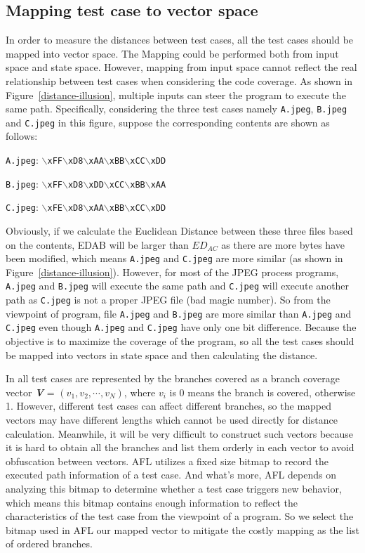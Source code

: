 \subsection{Mapping test case to vector space}
In order to measure the distances between test cases, all the test cases should be mapped into vector space. The Mapping could be performed both from input space and state space. However, mapping from input space cannot reflect the real relationship between test cases when considering the code coverage. As shown in Figure~\ref{distance-illusion}, multiple inputs can steer the program to execute the same path. Specifically, considering the three test cases namely \texttt{A.jpeg}, \texttt{B.jpeg} and \texttt{C.jpeg} in this figure, suppose the corresponding contents are shown as follows:

\texttt{A.jpeg}: \texttt{$\backslash$xFF$\backslash$xD8$\backslash$xAA$\backslash$xBB$\backslash$xCC$\backslash$xDD}

\texttt{B.jpeg}: \texttt{$\backslash$xFF$\backslash$xD8$\backslash$xDD$\backslash$xCC$\backslash$xBB$\backslash$xAA}

\texttt{C.jpeg}: \texttt{$\backslash$xFE$\backslash$xD8$\backslash$xAA$\backslash$xBB$\backslash$xCC$\backslash$xDD}

Obviously, if we calculate the Euclidean Distance between these three files based on the contents, EDAB will be larger than $ED_{AC}$ as there are more bytes have been modified, which means \texttt{A.jpeg} and \texttt{C.jpeg} are more similar (as shown in Figure~\ref{distance-illusion}). However, for most of the JPEG process programs, \texttt{A.jpeg} and \texttt{B.jpeg} will execute the same path and \texttt{C.jpeg} will execute another path as \texttt{C.jpeg} is not a proper JPEG file (bad magic number). So from the viewpoint of program, file \texttt{A.jpeg} and \texttt{B.jpeg} are more similar than \texttt{A.jpeg} and \texttt{C.jpeg} even though \texttt{A.jpeg} and \texttt{C.jpeg} have only one bit difference. Because the objective is to maximize the coverage of the program, so all the test cases should be mapped into vectors in state space and then calculating the distance.

In \cite{R1} all test cases are represented by the branches covered as a branch coverage vector \textbf{\textit{V}} = $(v_1, v_2, \cdots, v_N)$, where $v_i$ is 0 means the branch is covered, otherwise 1. However, different test cases can affect different branches, so the mapped vectors may have different lengths which cannot be used directly for distance calculation. Meanwhile, it will be very difficult to construct such vectors because it is hard to obtain all the branches and list them orderly in each vector to avoid obfuscation between vectors. AFL utilizes a fixed size bitmap to record the executed path information of a test case. And what’s more, AFL depends on analyzing this bitmap to determine whether a test case triggers new behavior, which means this bitmap contains enough information to reflect the characteristics of the test case from the viewpoint of a program. So we select the bitmap used in AFL our mapped vector to mitigate the costly mapping as the list of ordered branches.

